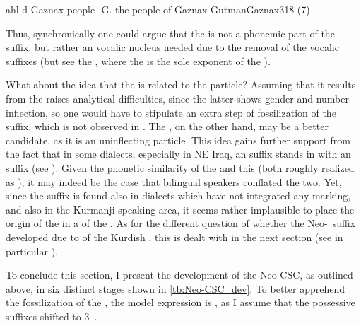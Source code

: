 {ahl-d Gaznax}
{people-\cst{} G.}
{the people of Gaznax}
{GutmanGaznax}{318 (7)}


Thus, synchronically one could argue that the  is not a phonemic part of the \ed suffix, but rather an  vocalic nucleus needed due to the removal of the vocalic  suffixes (but see the \Qar {}, where the  is the sole exponent of the \cst*).



















What about the idea that the  is related to the \ez* particle? Assuming that it results from the \Kur \ez* raises analytical difficulties, since the latter shows gender and number inflection, so one would have to stipulate an extra step of fossilization of the \ez* suffix, which is not observed in \Kur. The \Sor \ez*, on the other hand, may be a better candidate, as it is an uninflecting particle. This idea gains further support from the fact that in some dialects, especially in NE Iraq, an \ez* suffix  stands in  with an \ed suffix (see ). Given the phonetic similarity of the  and this \ez* (both roughly realized as \phonetic[ɪ]), it may indeed be the case that bilingual speakers conflated the two. Yet, since the \ed suffix is found also in dialects which have not integrated any \ez* marking, and also in the Kurmanji speaking area, it seems rather implausible to place the origin of the  in a  of the \ez*. As for the different question of whether the Neo-\cst\ suffix \ed developed due to  of the Kurdish \ez*, this is dealt with in the next section (see in particular ). 

To conclude this section, I present the development of the Neo-CSC, as outlined above, in six distinct stages shown in \vref{tb:Neo-CSC_dev}. To better apprehend the fossilization of the , the model \Syr expression is , as I assume that the \pl* possessive suffixes shifted to 3\masc\ .


